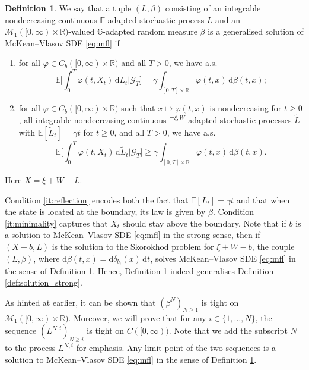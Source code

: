 \documentclass[11pt, a4paper]{article}
\theoremstyle{plain}
\theoremstyle{definition}
\newtheorem{definition}[theorem]{Definition}
\theoremstyle{remark}
\numberwithin{equation}{section}
\newcommand{\ev}{\mathbb{E}}
\newcommand{\R}{\mathbb{R}}
\renewcommand{\d}{\mathrm{d}}
\newcommand{\bb}[1]{\mathbb{#1}}
\renewcommand{\cal}[1]{\mathcal{#1}}
\begin{document}
\begin{definition} \label{def:generalised_solution}
We say that a tuple $(L, \beta)$ consisting of an integrable nondecreasing continuous $\bb{F}$-adapted stochastic process $L$ and an $\cal{M}_1([0, \infty) \times \R)$-valued $\bb{G}$-adapted random measure $\beta$ is a generalised solution of McKean--Vlasov SDE \eqref{eq:mfl} if 
\begin{enumerate}[noitemsep, label = (\roman*)]
    \item \label{it:reflection} for all $\varphi \in C_b([0, \infty) \times \R)$ and all $T > 0$, we have a.s.\@
    \begin{equation}
        \ev\biggl[\int_0^T \varphi(t, X_t) \, \d L_t \bigg\vert \cal{G}_T \biggr] = \gamma \int_{[0, T] \times \R} \varphi(t, x) \, \d \beta(t, x);
    \end{equation}
    \item \label{it:minimality} for all $\varphi \in C_b([0, \infty) \times \R)$ such that $x \mapsto \varphi(t, x)$ is nondecreasing for $t \geq 0$, all integrable nondecreasing continuous $\bb{F}^{\xi, W}$-adapted stochastic processes $\tilde{L}$ with $\ev[\tilde{L}_t] = \gamma t$ for $t \geq 0$, and all $T > 0$, we have a.s.\@
    \begin{equation}
        \ev\biggl[\int_0^T \varphi(t, X_t) \, \d \tilde{L}_t \bigg\vert \cal{G}_T \biggr] \geq \gamma\int_{[0, T] \times \R} \varphi(t, x) \, \d \beta(t, x).
    \end{equation}
\end{enumerate}
Here $X = \xi + W + L$.
\end{definition}

Condition \ref{it:reflection} encodes both the fact that $\ev[L_t] = \gamma t$ and that when the state is located at the boundary, its law is given by $\beta$. Condition \ref{it:minimality} captures that $X_t$ should stay above the boundary. Note that if $b$ is a solution to McKean--Vlasov SDE \eqref{eq:mfl} in the strong sense, then if $(X - b, L)$ is the solution to the Skorokhod problem for $\xi + W - b$, the couple $(L, \beta)$, where $\d \beta(t, x) = \d \delta_{b_t}(x) \, \d t$, solves McKean--Vlasov SDE \eqref{eq:mfl} in the sense of Definition \ref{def:generalised_solution}. Hence, Definition \ref{def:generalised_solution} indeed generalises Definition \ref{def:solution_strong}.

As hinted at earlier, it can be shown that $(\beta^N)_{N \geq 1}$ is tight on $\cal{M}_1([0, \infty) \times \R)$. Moreover, we will prove that for any $i \in \{1, \dots, N\}$, the sequence $(L^{N, i})_{N \geq i}$ is tight on $C([0, \infty))$. Note that we add the subscript $N$ to the process $L^{N, i}$ for emphasis. Any limit point of the two sequences is a solution to McKean--Vlasov SDE \eqref{eq:mfl} in the sense of Definition \ref{def:generalised_solution}.
\end{document}
